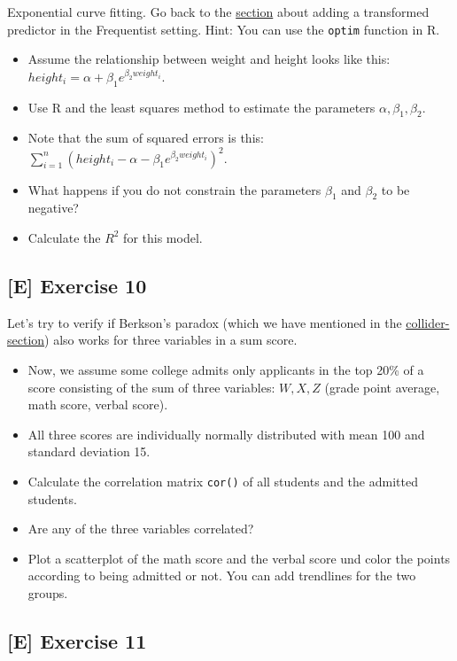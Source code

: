 \documentclass[
]{book}
\providecommand{\tightlist}{%
  \setlength{\itemsep}{0pt}\setlength{\parskip}{0pt}}
\begin{document}
Exponential curve fitting. Go back to the \hyperref[adding_transformed_predictor_freq]{section} about adding a transformed predictor in the Frequentist
setting. Hint: You can use the \texttt{optim} function in R.

\begin{itemize}
\tightlist
\item
  Assume the relationship between weight and height looks like this:
  \(height_i = \alpha + \beta_1 e^{\beta_2 weight_i}\).
\item
  Use R and the least squares method to estimate the parameters \(\alpha, \beta_1, \beta_2\).
\item
  Note that the sum of squared errors is this:
  \(\sum_{i=1}^n (height_i - \alpha - \beta_1 e^{\beta_2 weight_i})^2\).
\item
  What happens if you do not constrain the parameters \(\beta_1\) and \(\beta_2\) to be negative?
\item
  Calculate the \(R^2\) for this model.
\end{itemize}

\subsection{{[}E{]} Exercise 10}\label{exercise10_multiple_regression}

Let's try to verify if Berkson's paradox (which we have mentioned in the
\hyperref[collider]{collider-section}) also works for three variables in a sum score.

\begin{itemize}
\tightlist
\item
  Now, we assume some college admits only applicants in the top 20\% of a score
  consisting of the sum of three variables: \(W, X, Z\) (grade point average, math score, verbal score).
\item
  All three scores are individually normally distributed with mean 100 and standard deviation 15.
\item
  Calculate the correlation matrix \texttt{cor()} of all students and the admitted students.
\item
  Are any of the three variables correlated?
\item
  Plot a scatterplot of the math score and the verbal score und color the points according
  to being admitted or not. You can add trendlines for the two groups.
\end{itemize}

\subsection{{[}E{]} Exercise 11}\label{exercise11_multiple_regression}
\end{document}
